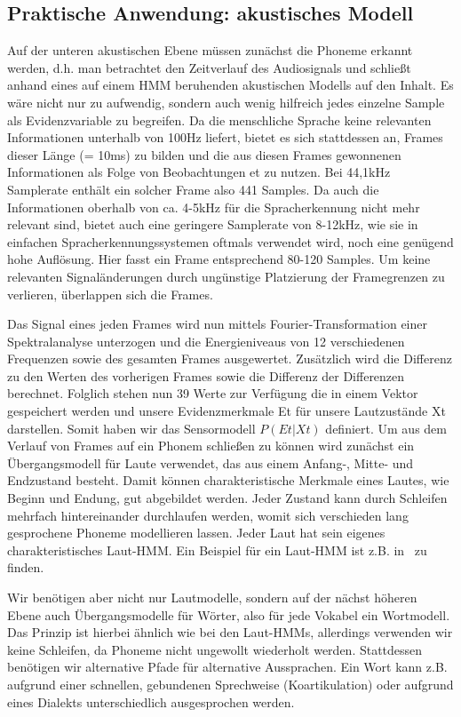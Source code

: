 \subsection{Praktische Anwendung: akustisches Modell}
Auf der unteren akustischen Ebene müssen zunächst die Phoneme erkannt werden, d.h.
man betrachtet den Zeitverlauf des Audiosignals und schließt anhand eines auf einem HMM beruhenden akustischen Modells auf den Inhalt.
Es wäre nicht nur zu aufwendig, sondern auch wenig hilfreich jedes einzelne Sample als Evidenzvariable zu begreifen.
Da die menschliche Sprache keine relevanten Informationen unterhalb von 100Hz liefert, bietet es sich stattdessen an, Frames dieser Länge (= 10ms) zu bilden und die aus diesen Frames gewonnenen Informationen als Folge von Beobachtungen et zu nutzen.
Bei 44,1kHz Samplerate enthält ein solcher Frame also 441 Samples.
Da auch die Informationen oberhalb von ca.
4-5kHz für die Spracherkennung nicht mehr relevant sind, bietet auch eine geringere Samplerate von 8-12kHz, wie sie in einfachen Spracherkennungssystemen oftmals verwendet wird, noch eine genügend hohe Auflösung.
Hier fasst ein Frame entsprechend 80-120 Samples.
Um keine relevanten Signaländerungen durch ungünstige Platzierung der Framegrenzen zu verlieren, überlappen sich die Frames.

Das Signal eines jeden Frames wird nun mittels Fourier-Transformation einer Spektralanalyse unterzogen und die Energieniveaus von 12 verschiedenen Frequenzen sowie des gesamten Frames ausgewertet.
Zusätzlich wird die Differenz zu den Werten des vorherigen Frames sowie die Differenz der Differenzen berechnet.
Folglich stehen nun 39 Werte zur Verfügung die in einem Vektor gespeichert werden und unsere Evidenzmerkmale Et für unsere Lautzustände Xt darstellen.
Somit haben wir das Sensormodell $P( Et | Xt )$ definiert.
Um aus dem Verlauf von Frames auf ein Phonem schließen zu können wird zunächst ein Übergangsmodell für Laute verwendet, das aus einem Anfang-, Mitte- und Endzustand besteht.
Damit können charakteristische Merkmale eines Lautes, wie Beginn und Endung, gut abgebildet werden.
Jeder Zustand kann durch Schleifen mehrfach hintereinander durchlaufen werden, womit sich verschieden lang gesprochene Phoneme modellieren lassen.
Jeder Laut hat sein eigenes charakteristisches Laut-HMM.
Ein Beispiel für ein Laut-HMM ist z.B. in~\cite[S. 1058]{russelnorvig} zu finden.

Wir benötigen aber nicht nur Lautmodelle, sondern auf der nächst höheren Ebene auch Übergangsmodelle für Wörter, also für jede Vokabel ein Wortmodell.
Das Prinzip ist hierbei ähnlich wie bei den Laut-HMMs, allerdings verwenden wir keine Schleifen, da Phoneme nicht ungewollt wiederholt werden.
Stattdessen benötigen wir alternative Pfade für alternative Aussprachen.
Ein Wort kann z.B.
aufgrund einer schnellen, gebundenen Sprechweise (Koartikulation) oder aufgrund eines Dialekts unterschiedlich ausgesprochen werden.

